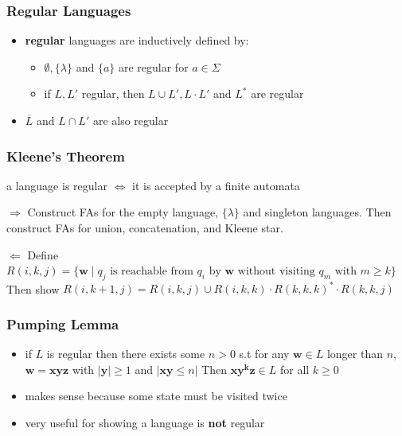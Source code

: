 \documentclass{beamer}
\begin{document}


\begin{frame}
  \frametitle{Regular Languages}
  \begin{itemize}
  \item \textbf{regular} languages are inductively defined by:
    \begin{itemize}
      \item $\emptyset, \{\lambda\}$ and $\{a\}$ are regular for $a \in \Sigma$
      \item if $L, L'$ regular, then $L \cup L', L \cdot L'$ and $L^*$ are
        regular
    \end{itemize}
   \item $\overline{L}$ and $L \cap L'$ are also regular
 \end{itemize}
\end{frame}


\begin{frame}
\frametitle{Kleene's Theorem}
\begin{theorem}
  a language is regular $\iff$ it is accepted by a finite automata
\end{theorem}
\begin{block}{$\Rightarrow$}
Construct FAs for the empty language, $\{\lambda\}$ and singleton
languages. Then construct FAs for union, concatenation, and Kleene star.
\end{block}

\begin{block}{$\Leftarrow$}
Define $R(i, k, j) = \{\mathbf{w} \; | \; q_j \text{ is reachable from } q_i
\text{ by } \mathbf{w}
\text{ without visiting } q_m \text{ with } m \geq k\}$\\

Then show $R(i, k+1, j) = R(i, k, j) \cup R(i, k, k) \cdot R(k, k, k)^* \cdot
R(k, k, j)$
\end{block}
\end{frame}


\begin{frame}
\frametitle{Pumping Lemma}
\begin{itemize}
  \item if $L$ is regular then there exists some $n > 0$ s.t for any $\mathbf{w}
    \in L$ longer than $n$, $\mathbf{w} = \mathbf{xyz}$ with $\lvert \mathbf{y} \rvert
    \geq 1$ and $\lvert \mathbf{xy} \leq n \rvert$
    Then $\mathbf{xy^kz} \in L$ for all $k \geq 0$
  \item makes sense because some state must be visited twice
  \item very useful for showing a language is \textbf{not} regular
\end{itemize}
\end{frame}
\end{document}
